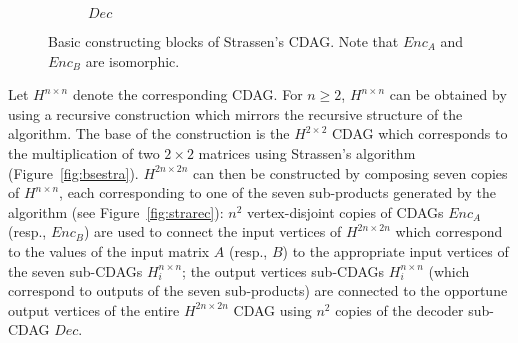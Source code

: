 \documentclass[a4paper,UKenglish]{lipics-v2016}
\begin{document}
\begin{figure}
\begin{subfigure}{.31\textwidth}
{
    }
  \caption{$Dec$}
  \label{fig:dec}
\end{subfigure}
\caption[Basic constructing blocks of Strassen's algorithm CDAG]{Basic constructing blocks of Strassen's CDAG. Note that $Enc_A$ and $Enc_B$ are isomorphic.}
\label{fig:fig}
\end{figure}
Let $H^{n \times n}$ denote the corresponding CDAG. For $n\geq 2$, $H^{n \times n}$ can be obtained by using a recursive construction which mirrors the recursive structure of the algorithm. The base of the construction is the $H^{2 \times 2}$ CDAG which corresponds to the multiplication of two $2 \times 2$ matrices using Strassen's algorithm (Figure~\ref{fig:bsestra}). $H^{2n \times 2n}$ can then be constructed by composing seven copies of $H^{n \times n}$, each corresponding to one of the seven sub-products generated by the algorithm (see Figure~\ref{fig:strarec}):  
  $n^2$ vertex-disjoint copies of CDAGs $Enc_A$ (resp., $Enc_B$) are used to connect the input vertices of $H^{2n \times 2n}$ which correspond to the values of the input matrix $A$ (resp., $B$) to the appropriate input vertices of the seven sub-CDAGs $H^{n \times n}_i$; the output vertices sub-CDAGs $H^{n \times n}_i$ (which  correspond to outputs of the seven sub-products) are connected to the opportune output vertices of the entire $H^{2n \times 2n}$ CDAG  using $n^2$ copies of the decoder sub-CDAG $Dec$.
  
\end{document}
